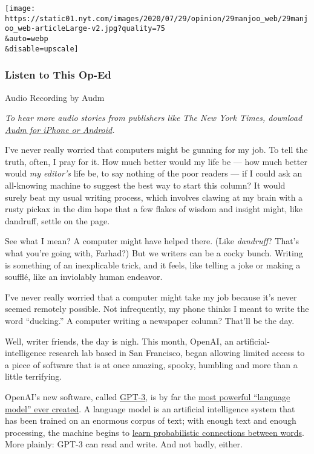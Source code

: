 \texttt{[image: https://static01.nyt.com/images/2020/07/29/opinion/29manjoo\_web/29manjoo\_web-articleLarge-v2.jpg?quality=75\\\&auto=webp\\\&disable=upscale]}

\hypertarget{listen-to-this-op-ed}{%
\subsubsection{Listen to This Op-Ed}\label{listen-to-this-op-ed}}

Audio Recording by Audm

\emph{To hear more audio stories from publishers like The New York
Times, download}
\href{https://www.audm.com/?utm_source=nytopinion\&utm_medium=embed\&utm_campaign=know_human_wrote}{\emph{Audm
for iPhone or Android}}\emph{.}

I've never really worried that computers might be gunning for my job. To
tell the truth, often, I pray for it. How much better would my life be
--- how much better would \emph{my editor's} life be, to say nothing of
the poor readers --- if I could ask an all-knowing machine to suggest
the best way to start this column? It would surely beat my usual writing
process, which involves clawing at my brain with a rusty pickax in the
dim hope that a few flakes of wisdom and insight might, like dandruff,
settle on the page.

See what I mean? A computer might have helped there. (Like
\emph{dandruff}? That's what you're going with, Farhad?) But we writers
can be a cocky bunch. Writing is something of an inexplicable trick, and
it feels, like telling a joke or making a soufflé, like an inviolably
human endeavor.

I've never really worried that a computer might take my job because it's
never seemed remotely possible. Not infrequently, my phone thinks I
meant to write the word ``ducking.'' A computer writing a newspaper
column? That'll be the day.

Well, writer friends, the day is nigh. This month, OpenAI, an
artificial-intelligence research lab based in San Francisco, began
allowing limited access to a piece of software that is at once amazing,
spooky, humbling and more than a little terrifying.

OpenAI's new software, called
\href{https://openai.com/blog/openai-api/}{GPT-3}, is by far the
\href{https://towardsdatascience.com/gpt-3-the-new-mighty-language-model-from-openai-a74ff35346fc}{most
powerful ``language model'' ever created}. A language model is an
artificial intelligence system that has been trained on an enormous
corpus of text; with enough text and enough processing, the machine
begins to
\href{https://www.analyticsvidhya.com/blog/2019/08/comprehensive-guide-language-model-nlp-python-code/}{learn
probabilistic connections between words}. More plainly: GPT-3 can read
and write. And not badly, either.

